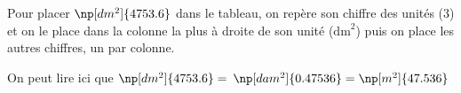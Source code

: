 \documentclass{classe-tex3R}
\begin{document}
\sautdiapo


\begin{exemple}
Pour placer $\np[dm^2]{4753.6}$ dans le tableau, on repère son chiffre des unités (3) et on le place dans la colonne la plus à droite de son unité ($\mathrm{dm}^2$) puis on place les autres chiffres, un par colonne.

\vspace{0.5em}


\vspace{1em}

    On peut lire ici que $\np[dm^2]{4753.6} =$ $ \np[dam^2]{0.47536} = \np[m^2]{47.536}$

\end{exemple}
\end{document}
